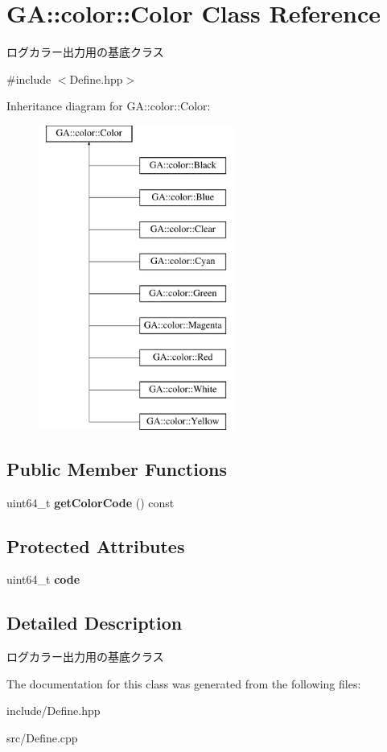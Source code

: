 \hypertarget{class_g_a_1_1color_1_1_color}{}\section{GA\+::color\+::Color Class Reference}
\label{class_g_a_1_1color_1_1_color}


ログカラー出力用の基底クラス  




{\ttfamily \#include $<$Define.\+hpp$>$}

Inheritance diagram for GA\+::color\+::Color\+:\begin{figure}[H]
\begin{center}
\leavevmode
\includegraphics[height=10.000000cm]{class_g_a_1_1color_1_1_color}
\end{center}
\end{figure}
\subsection*{Public Member Functions}
\begin{DoxyCompactItemize}
\item 
\mbox{\label{class_g_a_1_1color_1_1_color_aa6a45b84d2707ede55ef7c031344db93}} 
uint64\+\_\+t {\bfseries get\+Color\+Code} () const
\end{DoxyCompactItemize}
\subsection*{Protected Attributes}
\begin{DoxyCompactItemize}
\item 
\mbox{\label{class_g_a_1_1color_1_1_color_ae0d7f89a4cfa1644dc63eb0aae031619}} 
uint64\+\_\+t {\bfseries code}
\end{DoxyCompactItemize}


\subsection{Detailed Description}
ログカラー出力用の基底クラス 



The documentation for this class was generated from the following files\+:\begin{DoxyCompactItemize}
\item 
include/Define.\+hpp\item 
src/Define.\+cpp\end{DoxyCompactItemize}
